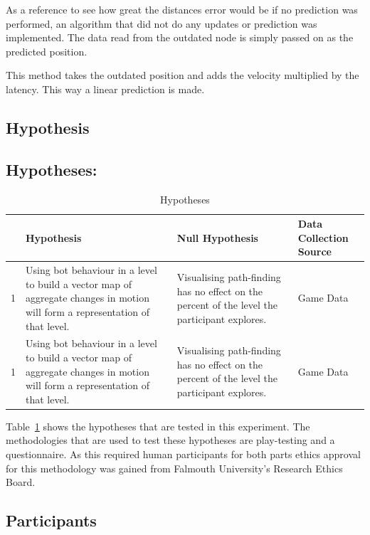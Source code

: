 \documentclass[journal]{IEEEtran}
\begin{document}
As a reference to see how great the distances error would be if no prediction
was performed, an algorithm that did not do any updates or prediction was
implemented. The data read from the outdated node is simply passed on as the
predicted position.

This method takes the outdated position and adds the velocity multiplied by the
latency. This way a linear prediction is made.

\subsection{Hypothesis}


	\subsection{Hypotheses:} \label{hypothesis}
	\begin{table}[h]
		\centering
		\caption{Hypotheses}
		\label{table:Hypothesis}
		\def\arraystretch{1.5}
		\begin{tabular}{|c|p{7cm}|p{7cm}|p{1.75cm}|}
			\hline
			& \textbf{Hypothesis}& \textbf{Null Hypothesis} & \textbf{Data Collection Source} \\ \hline
			1 & Using bot behaviour in a level to build a vector map of aggregate changes in motion will form a representation of that level.
			& Visualising path-finding has no effect on the percent of the level the participant explores.
			& Game Data \\ \hline
			1 & Using bot behaviour in a level to build a vector map of aggregate changes in motion will form a representation of that level.
			& Visualising path-finding has no effect on the percent of the level the participant explores.
			& Game Data \\ \hline
			
		\end{tabular}
	\end{table}
	Table~\ref{table:Hypothesis} shows the hypotheses that are tested in this experiment. The methodologies that are used to test these hypotheses are play-testing and a questionnaire. As this required human participants for both parts ethics approval for this methodology was gained from Falmouth University’s Research Ethics Board.
	

\subsection{Participants}








\end{document}
